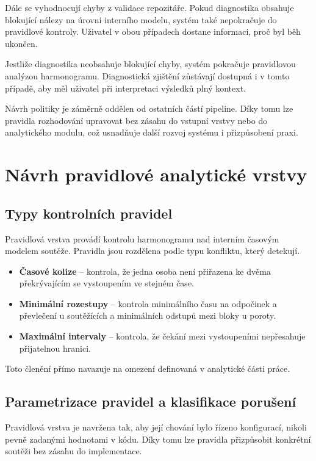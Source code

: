 \documentclass[czech, kiv, ba, he, iso690alph, pdf]{fasthesis}
\begin{document}
			Dále se vyhodnocují chyby z validace repozitáře. Pokud diagnostika obsahuje blokující nálezy na úrovni interního modelu, systém také nepokračuje do pravidlové kontroly. Uživatel v obou případech dostane informaci, proč byl běh ukončen.
	
			Jestliže diagnostika neobsahuje blokující chyby, systém pokračuje pravidlovou analýzou harmonogramu. Diagnostická zjištění zůstávají dostupná i v tomto případě, aby měl uživatel při interpretaci výsledků plný kontext.
	
			Návrh politiky je záměrně oddělen od ostatních částí pipeline. Díky tomu lze pravidla rozhodování upravovat bez zásahu do vstupní vrstvy nebo do analytického modulu, což usnadňuje další rozvoj systému i přizpůsobení praxi.
	
		\section{Návrh pravidlové analytické vrstvy}
	
			\subsection{Typy kontrolních pravidel}
				Pravidlová vrstva provádí kontrolu harmonogramu nad interním časovým modelem soutěže. Pravidla jsou rozdělena podle typu konfliktu, který detekují.
	
				\begin{itemize}
					\item \textbf{Časové kolize} -- kontrola, že jedna osoba není přiřazena ke dvěma 	překrývajícím se vystoupením ve stejném čase.
					\item \textbf{Minimální rozestupy} -- kontrola minimálního času na odpočinek a převlečení u soutěžících a minimálních odstupů mezi bloky u poroty.
					\item \textbf{Maximální intervaly} -- kontrola, že čekání mezi vystoupeními nepřesahuje přijatelnou hranici.
				\end{itemize}
	
				Toto členění přímo navazuje na omezení definovaná v analytické části práce.
	
			\subsection{Parametrizace pravidel a klasifikace porušení}
				Pravidlová vrstva je navržena tak, aby její chování bylo řízeno konfigurací, nikoli pevně zadanými hodnotami v kódu. Díky tomu lze pravidla přizpůsobit konkrétní soutěži bez zásahu do implementace.
	
\end{document}
